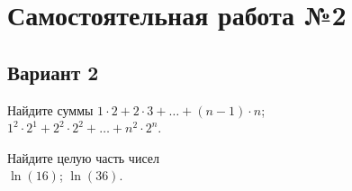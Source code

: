 
\section*{Самостоятельная работа №2}

\subsection*{Вариант 2}

\begin{problems}

\item
Найдите суммы
\subproblem \(
    1 \cdot 2 + 2 \cdot 3
    + \ldots + (n - 1) \cdot n %
\);
\\
\subproblem \(
    1^2 \cdot 2^{1} + 2^2 \cdot 2^{2}
    + \ldots + n^{2} \cdot 2^{n} %
\).

\item
Найдите целую часть чисел
\\
\subproblem $\ln(16)$;
\qquad
\subproblem $\ln(36)$.

\end{problems}

